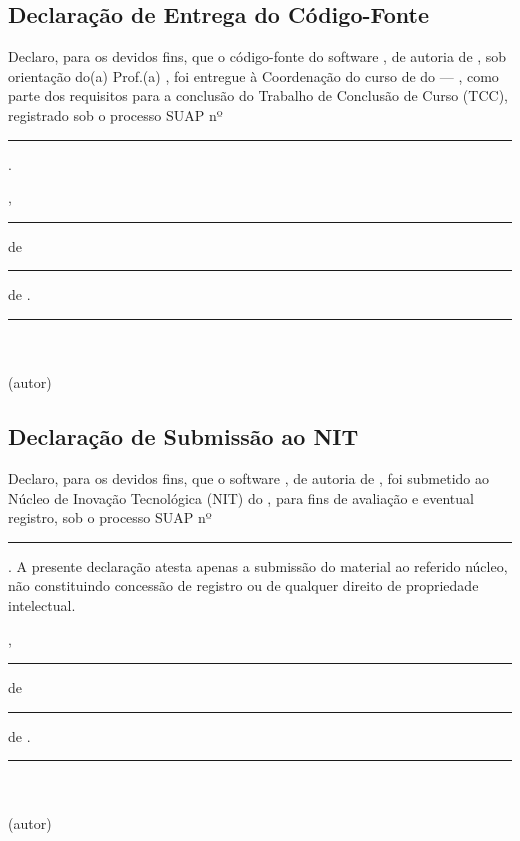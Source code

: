 
\subsection{Declaração de Entrega do Código-Fonte}

Declaro, para os devidos fins, que o código-fonte do software
\textbf{\Titulo}, de autoria de \textbf{\Autor}, sob orientação do(a)
Prof.(a) \textbf{\Orientador}, foi entregue à Coordenação do curso de
\Curso{} do \Instituicao{} --- \Campus, como parte dos requisitos para a
conclusão do Trabalho de Conclusão de Curso (TCC), registrado sob o
processo SUAP nº \rule[-0.2ex]{4cm}{0.4pt}.

\vspace{1.2cm}
\noindent\Cidade, \rule[-0.2ex]{1.2cm}{0.4pt} de \rule[-0.2ex]{3cm}{0.4pt} de \Ano.

\vspace{1.5cm}
\noindent\hfill\rule{8cm}{0.4pt}\hfill\mbox{}\\[-0.2ex]
\hspace*{\fill}\Autor\hspace*{\fill}\mbox{}\\[-0.2ex]
\hspace*{\fill}\small (autor)\hspace*{\fill}\mbox{}

\vspace{2cm}

\subsection{Declaração de Submissão ao NIT}

Declaro, para os devidos fins, que o software \textbf{\Titulo}, de autoria
de \textbf{\Autor}, foi submetido ao Núcleo de Inovação Tecnológica (NIT)
do \Instituicao{}, para fins de avaliação e eventual registro, sob o
processo SUAP nº \rule[-0.2ex]{4cm}{0.4pt}. A presente declaração atesta
apenas a submissão do material ao referido núcleo, não constituindo
concessão de registro ou de qualquer direito de propriedade intelectual.

\vspace{1.2cm}
\noindent\Cidade, \rule[-0.2ex]{1.2cm}{0.4pt} de \rule[-0.2ex]{3cm}{0.4pt} de \Ano.

\vspace{1.5cm}
\noindent\hfill\rule{8cm}{0.4pt}\hfill\mbox{}\\[-0.2ex]
\hspace*{\fill}\Autor\hspace*{\fill}\mbox{}\\[-0.2ex]
\hspace*{\fill}\small (autor)\hspace*{\fill}\mbox{}
